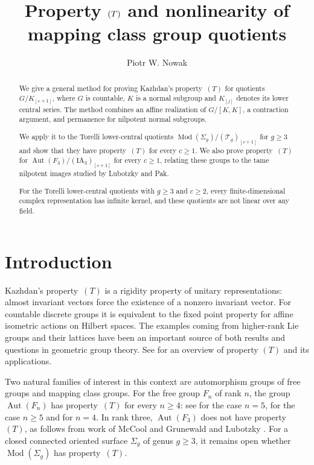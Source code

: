 \documentclass[11pt,a4paper]{article}
\title{Property \texorpdfstring{$\rt$}{(T)} and nonlinearity of mapping class group quotients}
\author{Piotr W. Nowak}
\theoremstyle{definition}
\newcommand{\Mod}{\operatorname{Mod}}
\newcommand{\Aut}{\operatorname{Aut}}
\newcommand{\rt}{(T)}
\begin{document}
\maketitle
\begin{abstract}
We give a general method for proving Kazhdan's property~\(\rt\)
for quotients \(G/K_{[c+1]}\), where \(G\) is countable, \(K\) is a normal subgroup
and \(K_{[j]}\) denotes its lower central series. The method
combines an affine realization of \(G/[K,K]\), a contraction
argument, and permanence for nilpotent normal subgroups.

We apply it to the Torelli lower-central quotients
\(\Mod(\Sigma_g)/(\mathcal{T}_g)_{[c+1]}\) for \(g\ge3\) and show that they have property~\(\rt\) for every \(c\ge1\).
We also prove
property~\(\rt\) for
\(\Aut(F_3)/(\mathrm{IA}_3)_{[c+1]}\) for every \(c\ge1\), relating
these groups to the tame nilpotent images studied by
Lubotzky and Pak. 

For the Torelli lower-central quotients with \(g\ge3\) and
\(c\ge2\), every finite-dimensional complex representation
has infinite kernel, and these quotients are not linear over
any field.
\end{abstract}


\section{Introduction}

Kazhdan's property~\(\rt\) is a rigidity property of unitary
representations: almost invariant vectors force the existence of
a nonzero invariant vector. For countable discrete groups it is
equivalent to the fixed point property for affine isometric actions
on Hilbert spaces. The examples coming from higher-rank Lie groups
and their lattices have been an important source of both results and
questions in geometric group theory. See \cite{BHV} for an overview of property \(\rt\) and its applications.

Two natural families of interest in this context are automorphism groups of free
groups and mapping class groups. 
For the free group \(F_n\) of rank \(n\), the group \(\Aut(F_n)\)
has property~\(\rt\) for every \(n\ge4\): see \cite{KalubaNowakOzawa} for the case \(n=5\), \cite{KalubaKielakNowak} for the case \(n\ge 5\) and \cite{NitscheAutFour} for \(n=4\).
In rank three, \(\Aut(F_3)\) does not have property~\(\rt\),
as follows from work of McCool \cite{McCool} and Grunewald and Lubotzky
\cite{GrunewaldLubotzky}.
For a closed connected oriented surface \(\Sigma_g\) of genus
\(g\ge3\), it remains open whether \(\Mod(\Sigma_g)\)
has property~\(\rt\).
\end{document}
